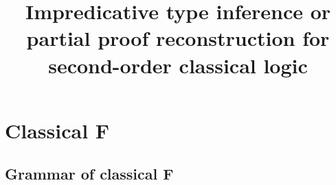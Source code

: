 \documentclass{amsart}
\title
[Impredicative type inference]
{
Impredicative type inference
\break
or
\break
partial proof reconstruction \break
for second-order classical logic
}
\begin{document}
\newcommand{\nc}{\newcommand}
\newcommand{\DotExpr}[2]{#1 #2.\ }
\nc\Abs    {\DotExpr\lambda}
\nc\All    {\DotExpr\forall}
\nc\Allin  {\forall\mathrm{in}}
\nc\Allex  {\forall\mathrm{ex}}
\nc\AppCC  {\mathrm{app/cc}}
\nc\Brouwer{\operatorname{Brouwer}}
\nc\CallCC {\mathrm{call/cc}}
\nc\Case   {}
\nc\Cps    {\operatorname{cps}}
\nc\Dn[1]  {(#1 \R \bot) \R \bot}
\nc\Dni    {\mathrm{\neg\neg I}}
\nc\Ex     {\DotExpr\exists}
\nc\Exin   {\exists\mathrm{in}}
\nc\Exex   {\exists\mathrm{ex}}
\nc\FV     {\operatorname{FV}}
\nc\Id     {\mathit{id}}
\nc\Indent {\hspace{3em}}
\nc\Mgs    {\operatorname{mgs}}
\nc\Or     {\ | \ }
\nc\Prune  {\operatorname{prune}}
\nc\Recall {\DotExpr\Xi} %
\nc\Redo   {\operatorname{redo}}
\nc\Tabs   {\DotExpr\Lambda}
\nc\R      {\rightarrow}
\nc\Undo   {\operatorname{undo}}
\nc\Unify  {\operatorname{unify}}
\maketitle
\tableofcontents

\section{Classical F}

\subsection{Grammar of classical F}

\nc\Ftype{
\tau & ::= & \alpha & \mbox{type variable} \\
&\Or& \tau \rightarrow \tau & \mbox{function type} \\
&\Or& \All\alpha\tau & \mbox{universal type} \\
}

\nc\CFtype{
\Ftype
&\Or& \Ex\alpha\tau & \mbox{existential type} \\
}

\nc\CFterm{
t & ::= & x & \mbox{variable} \\
&\Or& \Abs{x:\tau}t  & \mbox{lambda abstraction} \\
&\Or& \ t~t & \mbox{function application} \\
}

\nc\SelectiveTypeAmnesia{
&\Or& t~\{\Ex\alpha\tau\} & \mbox{selective type amnesia} \\
}

\nc\TypingContexts{
\Gamma & ::= & \Gamma, x : \tau & \mbox{term variable binding}\\
&\Or& \Gamma, \alpha& \mbox{type variable binding} \\
&\Or& \epsilon & \mbox{empty context}\\ \\
}
\end{document}
